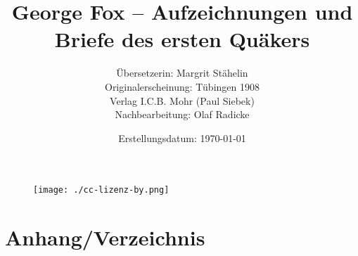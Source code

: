 \documentclass[a4paper,12pt,twoside]{book} %
\title{George Fox -- Aufzeichnungen und Briefe des ersten Quäkers}
\author{Übersetzerin: Margrit Stähelin \\ 
Originalerscheinung: Tübingen 1908 \\ 
Verlag I.C.B. Mohr (Paul Siebek) \\
Nachbearbeitung: Olaf Radicke
}
\date{Erstellungsdatum: \today}
\begin{document}
\maketitle


\begin{figure}[h!]
 \centering
 \texttt{[image: ./cc-lizenz-by.png]}
\end{figure}

\newpage 

\tableofcontents

\newpage

\frontmatter 



\newpage 

\mainmatter 

% 

































% 
 
\backmatter

\chapter{Anhang/Verzeichnis}



\cleardoublepage


\cleardoublepage

\printindex

  \printindex[bibel]
\cleardoublepage

  \printindex[brief]
\cleardoublepage

  \printindex[buch]
\cleardoublepage

  \printindex[ort]
\cleardoublepage

  \printindex[person]
\cleardoublepage
\end{document}
